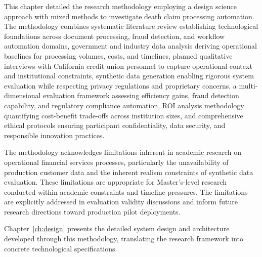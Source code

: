 This chapter detailed the research methodology employing a design science approach with mixed methods to investigate death claim processing automation. The methodology combines systematic literature review establishing technological foundations across document processing, fraud detection, and workflow automation domains, government and industry data analysis deriving operational baselines for processing volumes, costs, and timelines, planned qualitative interviews with California credit union personnel to capture operational context and institutional constraints, synthetic data generation enabling rigorous system evaluation while respecting privacy regulations and proprietary concerns, a multi-dimensional evaluation framework assessing efficiency gains, fraud detection capability, and regulatory compliance automation, ROI analysis methodology quantifying cost-benefit trade-offs across institution sizes, and comprehensive ethical protocols ensuring participant confidentiality, data security, and responsible innovation practices.

The methodology acknowledges limitations inherent in academic research on operational financial services processes, particularly the unavailability of production customer data and the inherent realism constraints of synthetic data evaluation. These limitations are appropriate for Master's-level research conducted within academic constraints and timeline pressures. The limitations are explicitly addressed in evaluation validity discussions and inform future research directions toward production pilot deployments.

Chapter~\ref{ch:design} presents the detailed system design and architecture developed through this methodology, translating the research framework into concrete technological specifications.
